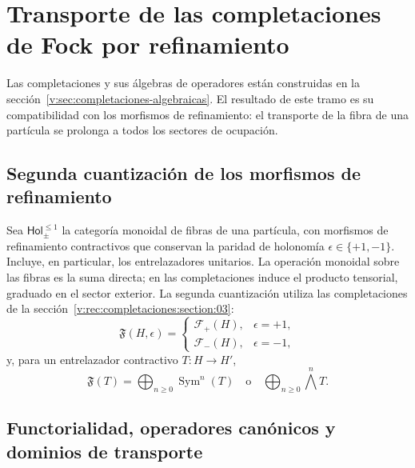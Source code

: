 \section{Transporte de las completaciones de Fock por refinamiento}
\label{v:rec:fock_gibbs:section:01}

Las completaciones y sus álgebras de operadores están construidas en la
sección~\ref{v:sec:completaciones-algebraicas}. El resultado de este tramo
es su compatibilidad con los morfismos de refinamiento: el transporte de
la fibra de una partícula se prolonga a todos los sectores de ocupación.

\subsection{Segunda cuantización de los morfismos de refinamiento}
\label{v:rec:fock_gibbs:section:02}

Sea \(\mathsf{Hol}_{\pm}^{\leq1}\) la categoría monoidal de fibras de una
partícula, con morfismos de refinamiento contractivos que conservan la
paridad de holonomía \(\epsilon\in\{+1,-1\}\). Incluye, en particular,
los entrelazadores unitarios. La operación monoidal sobre las fibras es
la suma directa; en las completaciones induce el producto tensorial,
graduado en el sector exterior. La segunda cuantización utiliza las
completaciones de la sección~\ref{v:rec:completaciones:section:03}:
\[
 \mathfrak F(H,\epsilon)=
 \begin{cases}
 \mathcal F_+(H),
     &\epsilon=+1,\\[2mm]
 \mathcal F_-(H),
     &\epsilon=-1,
 \end{cases}
\]
y, para un entrelazador contractivo \(T:H\to H'\),
\[
 \mathfrak F(T)=
 \bigoplus_{n\ge0}\operatorname{Sym}^n(T)
 \quad\text{o}\quad
 \bigoplus_{n\ge0}\bigwedge^n\!T.
\]

\subsection{Functorialidad, operadores canónicos y dominios de transporte}
\label{v:rec:fock_gibbs:section:03}

